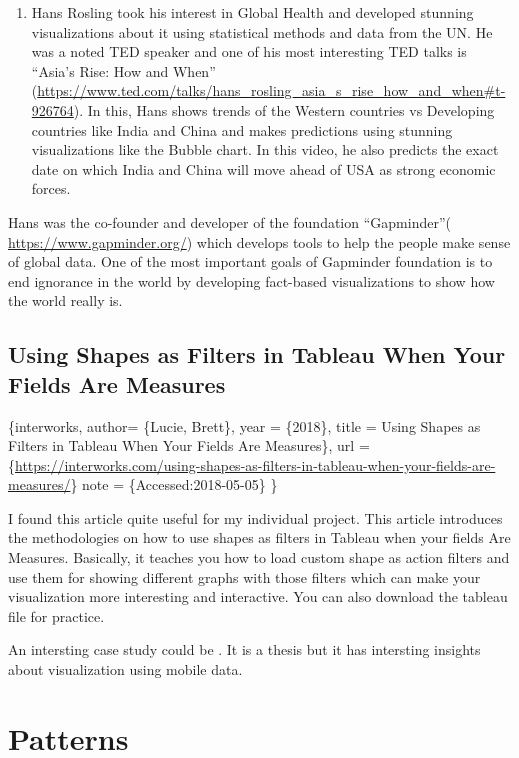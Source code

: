 \documentclass[]{book}
\providecommand{\tightlist}{%
  \setlength{\itemsep}{0pt}\setlength{\parskip}{0pt}}
\theoremstyle{definition}
\theoremstyle{definition}
\theoremstyle{definition}
\theoremstyle{remark}
\begin{document}
\begin{enumerate}
\def\labelenumi{\alph{enumi}.}
\tightlist
\item
  Hans Rosling took his interest in Global Health and developed stunning
  visualizations about it using statistical methods and data from the
  UN. He was a noted TED speaker and one of his most interesting TED
  talks is ``Asia's Rise: How and When''
  (\url{https://www.ted.com/talks/hans_rosling_asia_s_rise_how_and_when\#t-926764}).
  In this, Hans shows trends of the Western countries vs Developing
  countries like India and China and makes predictions using stunning
  visualizations like the Bubble chart. In this video, he also predicts
  the exact date on which India and China will move ahead of USA as
  strong economic forces.
\end{enumerate}

Hans was the co-founder and developer of the foundation ``Gapminder''(
\url{https://www.gapminder.org/}) which develops tools to help the
people make sense of global data. One of the most important goals of
Gapminder foundation is to end ignorance in the world by developing
fact-based visualizations to show how the world really is.

\section{Using Shapes as Filters in Tableau When Your Fields Are
Measures}\label{using-shapes-as-filters-in-tableau-when-your-fields-are-measures}

\citet{misc}\{interworks, author= \{Lucie, Brett\}, year = \{2018\},
title = Using Shapes as Filters in Tableau When Your Fields Are
Measures\}, url
=\{\url{https://interworks.com/using-shapes-as-filters-in-tableau-when-your-fields-are-measures/}\}
note = \{Accessed:2018-05-05\} \}

I found this article quite useful for my individual project. This
article introduces the methodologies on how to use shapes as filters in
Tableau when your fields Are Measures. Basically, it teaches you how to
load custom shape as action filters and use them for showing different
graphs with those filters which can make your visualization more
interesting and interactive. You can also download the tableau file for
practice.

An intersting case study could be \citep{case_thesis}. It is a thesis
but it has intersting insights about visualization using mobile data.

\chapter{Patterns}\label{patterns}
\end{document}
